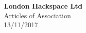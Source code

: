 

\begin{titlepage}
\begin{center}
{\bf \LARGE London Hackspace Ltd}\\[36pt]
    {\Large Articles of Association}\\[36pt]
13/11/2017
\vfill

\end{center}
\end{titlepage}


